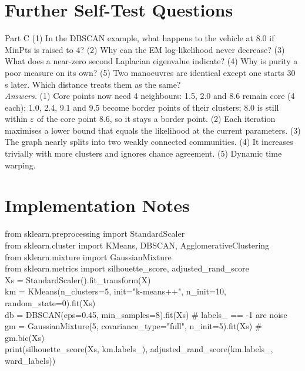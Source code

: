 \documentclass[11pt]{article}
\begin{document}
\section{Further Self-Test Questions}
\begin{question}{Part C}
(1) In the DBSCAN example, what happens to the vehicle at 8.0 if MinPts is raised to 4? (2) Why can the EM log-likelihood never decrease? (3) What does a near-zero second Laplacian eigenvalue indicate? (4) Why is purity a poor measure on its own? (5) Two manoeuvres are identical except one starts 30 s later. Which distance treats them as the same?\\
\textit{Answers.} (1) Core points now need 4 neighbours: 1.5, 2.0 and 8.6 remain core (4 each); 1.0, 2.4, 9.1 and 9.5 become border points of their clusters; 8.0 is still within $\varepsilon$ of the core point 8.6, so it stays a border point. (2) Each iteration maximises a lower bound that equals the likelihood at the current parameters. (3) The graph nearly splits into two weakly connected communities. (4) It increases trivially with more clusters and ignores chance agreement. (5) Dynamic time warping.
\end{question}

\section{Implementation Notes}
\begin{center}\begin{minipage}{0.92\textwidth}\small\ttfamily
from sklearn.preprocessing import StandardScaler\\
from sklearn.cluster import KMeans, DBSCAN, AgglomerativeClustering\\
from sklearn.mixture import GaussianMixture\\
from sklearn.metrics import silhouette\_score, adjusted\_rand\_score\\[2pt]
Xs = StandardScaler().fit\_transform(X)\\
km = KMeans(n\_clusters=5, init="k-means++", n\_init=10, random\_state=0).fit(Xs)\\
db = DBSCAN(eps=0.45, min\_samples=8).fit(Xs) \quad \# labels\_ == -1 are noise\\
gm = GaussianMixture(5, covariance\_type="full", n\_init=5).fit(Xs) \quad \# gm.bic(Xs)\\
print(silhouette\_score(Xs, km.labels\_), adjusted\_rand\_score(km.labels\_, ward\_labels))
\end{minipage}\end{center}
\end{document}
